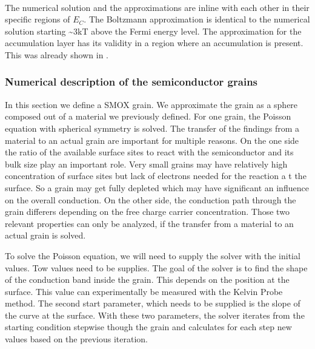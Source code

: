 \documentclass[11pt]{article}
\begin{document}
    \begin{center}
    \end{center}
    { \hspace*{\fill} \\}
    
    The numerical solution and the approximations are inline with each other
in their specific regions of \(E_C\). The Boltzmann approximation is
identical to the numerical solution starting \textasciitilde3kT above
the Fermi energy level. The approximation for the accumulation layer has
its validity in a region where an accumulation is present. This was
already shown in \cite{Barsan2011a}.

    \hypertarget{numerical-description-of-the-semiconductor-grains}{%
\subsubsection{Numerical description of the semiconductor
grains}\label{numerical-description-of-the-semiconductor-grains}}

In this section we define a SMOX grain. We approximate the grain as a
sphere composed out of a material we previously defined. For one grain,
the Poisson equation with spherical symmetry is solved. The transfer of
the findings from a material to an actual grain are important for
multiple reasons. On the one side the ratio of the available surface
sites to react with the semiconductor and its bulk size play an
important role. Very small grains may have relatively high concentration
of surface sites but lack of electrons needed for the reaction a t the
surface. So a grain may get fully depleted which may have significant an
influence on the overall conduction. On the other side, the conduction
path through the grain differers depending on the free charge carrier
concentration. Those two relevant properties can only be analyzed, if
the transfer from a material to an actual grain is solved.

To solve the Poisson equation, we will need to supply the solver with
the initial values. Tow values need to be supplies. The goal of the
solver is to find the shape of the conduction band inside the grain.
This depends on the position at the surface. This value can
experimentally be measured with the Kelvin Probe method. The second
start parameter, which needs to be supplied is the slope of the curve at
the surface. With these two parameters, the solver iterates from the
starting condition stepwise though the grain and calculates for each
step new values based on the previous iteration.
\end{document}
